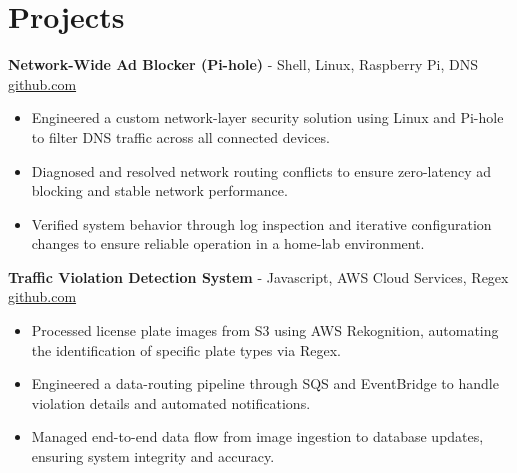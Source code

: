 \documentclass[11pt]{article}       %
\begin{document}
\vspace{-18.5pt}

\section*{Projects}

\textbf{Network-Wide Ad Blocker (Pi-hole)}{ - Shell, Linux, Raspberry Pi, DNS} \hfill \href{https://github.com/Monica20030707}{github.com} \\
\vspace{-9pt}
\begin{itemize}
  \item Engineered a custom network-layer security solution using Linux and Pi-hole to filter DNS traffic across all connected devices.
  \item Diagnosed and resolved network routing conflicts to ensure zero-latency ad blocking and stable network performance.
  \item Verified system behavior through log inspection and iterative configuration changes to ensure reliable operation in a home-lab environment.
\end{itemize}

\textbf{Traffic Violation Detection System}{ - Javascript, AWS Cloud Services, Regex} \hfill \href{https://github.com/Monica20030707/AWS_rekonigition-N-read-database}{github.com} \\
\vspace{-9pt}
\begin{itemize}
  \item Processed license plate images from S3 using AWS Rekognition, automating the identification of specific plate types via Regex.
  \item Engineered a data-routing pipeline through SQS and EventBridge to handle violation details and automated notifications.
  \item Managed end-to-end data flow from image ingestion to database updates, ensuring system integrity and accuracy.
\end{itemize}

\end{document}
